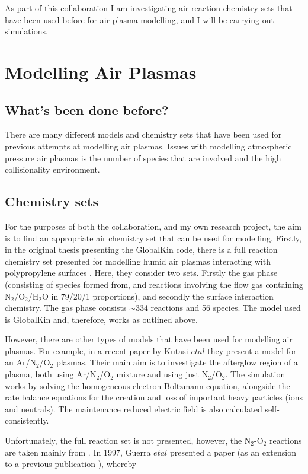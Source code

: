 \documentclass[11pt, oneside]{article}   	%
\begin{document}
As part of this collaboration I am investigating air reaction chemistry sets that have been used before for air plasma modelling, and I will be carrying out simulations.


\section{Modelling Air Plasmas}
\subsection{What's been done before?} 
There are many different models and chemistry sets that have been used for previous attempts at modelling air plasmas. 
Issues with modelling atmospheric pressure air plasmas is the number of species that are involved and the high collisionality environment.
\subsection{Chemistry sets}
For the purposes of both the collaboration, and my own research project, the aim is to find an appropriate air chemistry set that can be used for modelling.
Firstly, in the original thesis presenting the GlobalKin code, there is a full reaction chemistry set presented for modelling humid air plasmas interacting with polypropylene surfaces \cite{Dorai2002modeling}.
Here, they consider two sets.
Firstly the gas phase (consisting of species formed from, and reactions involving the flow gas containing N$_2$/O$_2$/H$_2$O in 79/20/1 proportions), and secondly the surface interaction chemistry. 
The gas phase consists $\sim$334 reactions and 56 species. 
The model used is GlobalKin and, therefore, works as outlined above.

However, there are other types of models that have been used for modelling air plasmas.
For example, in a recent paper by Kutasi $et al$ \cite{Kutasi2016tuning} they present a model for an Ar/N$_2$/O$_2$ plasmas.
Their main aim is to investigate the afterglow region of a plasma, both using Ar/N$_2$/O$_2$ mixture and using just N$_2$/O$_2$.
The simulation works by solving the homogeneous electron Boltzmann equation, alongside the rate balance equations for the creation and loss of important heavy particles (ions and neutrals). 
The maintenance reduced electric field is also calculated self-consistently.

Unfortunately, the full reaction set is not presented, however, the N$_2$-O$_2$ reactions are taken mainly from \cite{Guerra1997self, Pintassilgo2005modelling, Kutasi2008modelling}.
In 1997, Guerra $et al$ \cite{Guerra1997self} presented a paper (as an extension to a previous publication \cite{Guerra1995non}), whereby 
\end{document}
